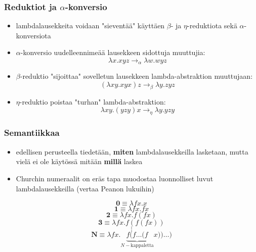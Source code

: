 \documentclass[12pt]{beamer}
\begin{document}
\begin{frame}
\frametitle{Reduktiot ja $\alpha$-konversio}
\begin{itemize}
\item lambdalausekkeita voidaan "sieventää" käyttäen $\beta$- ja $\eta$-reduktiota sekä $\alpha$-konversiota
\pause
\item $\alpha$-konversio uudelleennimeää lausekkeen sidottuja muuttujia:
\[ \lambda x . xyz  \rightarrow_{\alpha} \lambda w . wyz  \]
\pause
\item $\beta$-reduktio "sijoittaa" sovelletun lausekkeen lambda-abstraktion muuttujaan:
\[ (\lambda xy . xyx) z  \rightarrow_{\beta} \lambda y . zyz \]
\pause
\item $\eta$-reduktio poistaa "turhan" lambda-abstraktion:
\[ \lambda xy . (yzy) x \rightarrow_{\eta} \lambda y . yzy \]
\end{itemize}
\end{frame}

\begin{frame}
\frametitle{Semantiikkaa}
\begin{itemize}
\item edellisen perusteella tiedetään, \textbf{miten} lambdalausekkeilla lasketaan, mutta vielä ei ole käytössä mitään \textbf{millä} laskea
\pause
\item Churchin numeraalit on eräs tapa muodostaa luonnolliset luvut lambdalausekkeilla (vertaa Peanon lukuihin)	 
\end{itemize}
\pause

\[ \textbf{0} \equiv \lambda fx . x \]
\[ \textbf{1} \equiv \lambda fx . fx \]
\[ \textbf{2} \equiv \lambda fx . f (fx) \] 
\[ \textbf{3} \equiv \lambda fx . f(f(fx)) \]
\[ \vdots \]
\[ \textbf{N} \equiv \lambda fx . \underbrace{ f ( f \ldots (f }_{ N-\text{kappaletta}} x)) \ldots ) \] 
\end{frame}

\begin{frame}

\end{frame}
\end{document}
